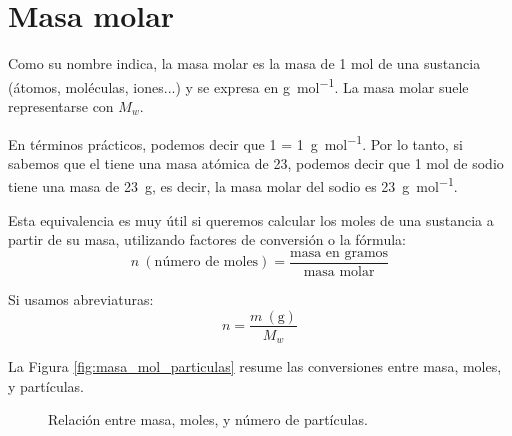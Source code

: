 \section{Masa molar}

Como su nombre indica, la masa molar es la masa de 1 mol de una sustancia (átomos, moléculas, iones...) y se expresa en \unit{\g\per\mole}. La masa molar suele representarse con \( M_w \).

En términos prácticos, podemos decir que \qty{1}{\uma} = \qty{1}{\g\per\mole}. Por lo tanto, si sabemos que el  tiene una masa atómica de \qty{23}{\uma}, podemos decir que 1 mol de sodio tiene una masa de \qty{23}{\g}, es decir, la masa molar del sodio es \qty{23}{\g\per\mole}.

Esta equivalencia es muy útil si queremos calcular los moles de una sustancia a partir de su masa, utilizando factores de conversión o la fórmula:
\begin{equation*}
    n\ (\text{número de moles}) = \dfrac{\text{masa en gramos}}{\text{masa molar}}
\end{equation*}

Si usamos abreviaturas:
\begin{equation*}
    n = \dfrac{m\ (\text{g})}{M_w}
\end{equation*}

La Figura \eqref{fig:masa_mol_particulas} resume las conversiones entre masa, moles, y partículas.

\begin{figure}[ht]
    \centering
    \caption{Relación entre masa, moles, y número de partículas.}
    \label{fig:masa_mol_particulas}
\end{figure}

